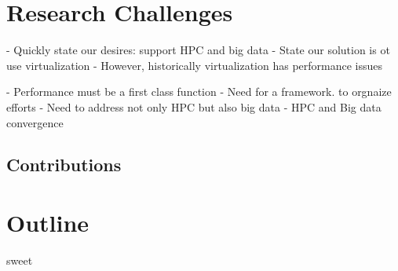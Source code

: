 \section{Research Challenges}
\label{sec:chall}






- Quickly state our desires: support HPC and big data
- State our solution is ot use virtualization
- However, historically virtualization has performance issues



- Performance must be a first class function
- Need for a framework.  to orgnaize efforts
- Need to address not only HPC but also big data
- HPC and Big data convergence 


\subsection{Contributions}



\section{Outline}
\label{sec:outline}
sweet
